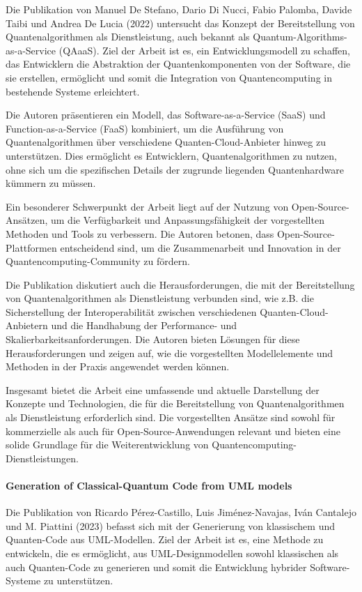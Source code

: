 Die Publikation von Manuel De Stefano, Dario Di Nucci, Fabio Palomba, Davide Taibi und Andrea De Lucia (2022) \cite{Stefano_2022} untersucht 
das Konzept der Bereitstellung von Quantenalgorithmen als Dienstleistung, auch bekannt als Quantum-Algorithms-as-a-Service (QAaaS). 
Ziel der Arbeit ist es, ein Entwicklungsmodell zu schaffen, das Entwicklern die Abstraktion der Quantenkomponenten von der 
Software, die sie erstellen, ermöglicht und somit die Integration von Quantencomputing in bestehende Systeme erleichtert.

Die Autoren präsentieren ein Modell, das Software-as-a-Service (SaaS) und Function-as-a-Service (FaaS) kombiniert, um 
die Ausführung von Quantenalgorithmen über verschiedene Quanten-Cloud-Anbieter hinweg zu unterstützen. Dies ermöglicht es 
Entwicklern, Quantenalgorithmen zu nutzen, ohne sich um die spezifischen Details der zugrunde liegenden Quantenhardware kümmern zu müssen. 

Ein besonderer Schwerpunkt der Arbeit liegt auf der Nutzung von Open-Source-Ansätzen, um die Verfügbarkeit und 
Anpassungsfähigkeit der vorgestellten Methoden und Tools zu verbessern. Die Autoren betonen, dass Open-Source-Plattformen 
entscheidend sind, um die Zusammenarbeit und Innovation in der Quantencomputing-Community zu fördern.

Die Publikation diskutiert auch die Herausforderungen, die mit der Bereitstellung von Quantenalgorithmen als 
Dienstleistung verbunden sind, wie z.B. die Sicherstellung der Interoperabilität zwischen verschiedenen Quanten-Cloud-Anbietern 
und die Handhabung der Performance- und Skalierbarkeitsanforderungen. Die Autoren bieten Lösungen für diese Herausforderungen 
und zeigen auf, wie die vorgestellten Modellelemente und Methoden in der Praxis angewendet werden können.

Insgesamt bietet die Arbeit eine umfassende und aktuelle Darstellung der Konzepte und Technologien, die für die 
Bereitstellung von Quantenalgorithmen als Dienstleistung erforderlich sind. Die vorgestellten Ansätze sind sowohl 
für kommerzielle als auch für Open-Source-Anwendungen relevant und bieten eine solide Grundlage für die Weiterentwicklung 
von Quantencomputing-Dienstleistungen.

\paragraph{Generation of Classical-Quantum Code from UML models}

Die Publikation von Ricardo Pérez-Castillo, Luis Jiménez-Navajas, Iván Cantalejo und M. Piattini (2023) \cite{Perez-Castillo_2023} 
befasst sich mit der Generierung von klassischem und Quanten-Code aus UML-Modellen. Ziel der Arbeit ist es, 
eine Methode zu entwickeln, die es ermöglicht, aus UML-Designmodellen sowohl klassischen als auch Quanten-Code 
zu generieren und somit die Entwicklung hybrider Software-Systeme zu unterstützen.

